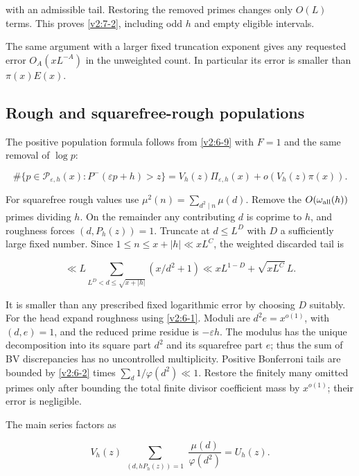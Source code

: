 \documentclass[11pt]{article}
\theoremstyle{definition}
\theoremstyle{remark}
\numberwithin{equation}{section}
\begin{document}
with an admissible tail. Restoring the removed primes changes only $O(L)$ terms. This proves \eqref{v2:7-2}, including odd $h$ and empty eligible intervals.


The same argument with a larger fixed truncation exponent gives
any requested error $O_A(xL^{-A})$ in the unweighted count.
In particular its error is smaller than $\pi(x)E(x)$.
\subsection{Rough and squarefree-rough populations}\label{subsec:rough-density}
The positive population formula follows from \eqref{v2:6-9} with $F=1$ and the same removal of $\log p$:


\begin{equation}\label{v2:6-14}
\#\{p\in\mathcal P_{\varepsilon,h}(x):P^-(\varepsilon p+h)>z\}
=V_h(z)\Pi_{\varepsilon,h}(x)+o(V_h(z)\pi(x)).
\end{equation}


For squarefree rough values use $\mu^2(n)=\sum_{d^2\mid n}\mu(d)$. Remove the $O(\omega_{\rm all}(h))$ primes dividing $h$. On the remainder any contributing $d$ is coprime to $h$, and roughness forces $(d,P_h(z))=1$. Truncate at $d\le L^D$ with $D$ a sufficiently large fixed number. Since $1\le n\le x+|h|\ll xL^C$, the weighted discarded tail is


\begin{equation}\label{v2:6-15}
\ll L\sum_{L^D<d\le\sqrt{x+|h|}}(x/d^2+1)
\ll xL^{1-D}+\sqrt{xL^C}\,L.
\end{equation}


It is smaller than any prescribed fixed logarithmic error by choosing $D$ suitably. For the head expand roughness using \eqref{v2:6-1}. Moduli are $d^2e=x^{o(1)}$, with $(d,e)=1$, and the reduced prime residue is $-\varepsilon h$. The modulus has the unique decomposition into its square part $d^2$ and its squarefree part $e$; thus the sum of BV discrepancies has no uncontrolled multiplicity. Positive Bonferroni tails are bounded by \eqref{v2:6-2} times $\sum_d1/\varphi(d^2)\ll1$. Restore the finitely many omitted primes only after bounding the total finite divisor coefficient mass by $x^{o(1)}$; their error is negligible.

The main series factors as


\begin{equation}
V_h(z)\sum_{\substack{(d,hP_h(z))=1}}\frac{\mu(d)}{\varphi(d^2)}=U_h(z).
\end{equation}
\end{document}
